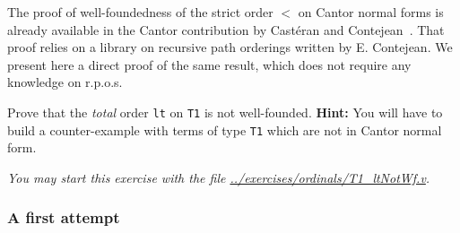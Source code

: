 The proof of well-foundedness of the strict order $<$ on Cantor normal forms is already 
available in the Cantor contribution by Castéran and Contejean~\cite{CantorContrib}. That proof relies on a library on recursive path orderings written by
E. Contejean. We present here  a direct proof of the same result, which does not require any knowledge on r.p.o.s.


\begin{exercise}
Prove that the \emph{total} order \texttt{lt} on \texttt{T1} is not well-founded. 
\textbf{Hint:}  You will have to build a counter-example with terms of type \texttt{T1}
which are not in Cantor normal form.

\emph{You may start this exercise with the file
\url{../exercises/ordinals/T1_ltNotWf.v}.}
\end{exercise}



  

 




\subsubsection{A first attempt}
\label{sec:orgheadline77}

